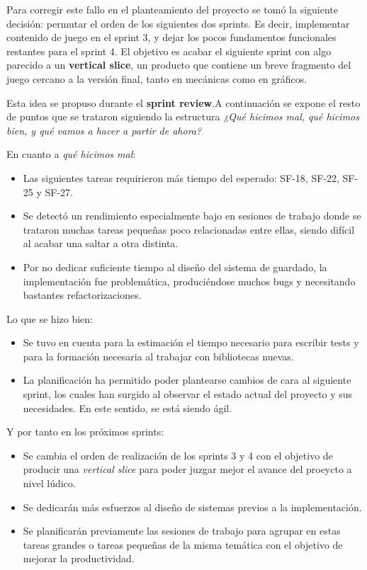 Para corregir este fallo en el planteamiento del proyecto se tomó la siguiente decisión: permutar el orden de los siguientes dos sprints. Es decir, implementar contenido de juego en el sprint 3, y dejar los pocos fundamentos funcionales restantes para el sprint 4. El objetivo es acabar el siguiente sprint con algo parecido a un \textbf{vertical slice}, un producto que contiene un breve fragmento del juego cercano a la versión final, tanto en mecánicas como en gráficos.

Esta idea se propuso durante el \textbf{sprint review}.A continuación se expone el resto de puntos que se trataron siguiendo la estructura \textit{¿Qué hicimos mal, qué hicimos bien, y qué vamos a hacer a partir de ahora?}

En cuanto a \textit{qué hicimos mal}:
\begin{itemize}
    \item Las siguientes tareas requirieron más tiempo del esperado: SF-18, SF-22, SF-25 y SF-27.
    \item Se detectó un rendimiento especialmente bajo en sesiones de trabajo donde se trataron muchas tareas pequeñas poco relacionadas entre ellas, siendo difícil al acabar una saltar a otra distinta.
    \item Por no dedicar suficiente tiempo al diseño del sistema de guardado, la implementación fue problemática, produciéndose muchos bugs y necesitando bastantes refactorizaciones.
\end{itemize}

Lo que se hizo bien:
\begin{itemize}
    \item Se tuvo en cuenta para la estimación el tiempo necesario para escribir tests y para la formación necesaria al trabajar con bibliotecas nuevas. 
    \item La planificación ha permitido poder plantearse cambios de cara al siguiente sprint, los cuales han surgido al observar el estado actual del proyecto y sus necesidades. En este sentido, se está siendo ágil.
\end{itemize}

Y por tanto en los próximos sprints:
\begin{itemize}
    \item Se cambia el orden de realización de los sprints 3 y 4 con el objetivo de producir una \textit{vertical slice} para poder juzgar mejor el avance del proeycto a nivel lúdico.
    \item Se dedicarán más esfuerzos al diseño de sistemas previos a la implementación.
    \item Se planificarán previamente las sesiones de trabajo para agrupar en estas tareas grandes o tareas pequeñas de la misma temática con el objetivo de mejorar la productividad.
\end{itemize}

